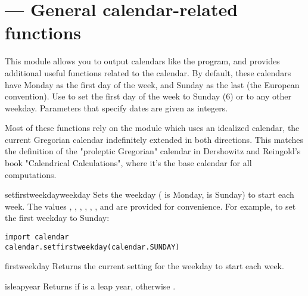 \section{ ---
         General calendar-related functions}


This module allows you to output calendars like the \UNIX{}
 program, and provides additional useful functions
related to the calendar. By default, these calendars have Monday as
the first day of the week, and Sunday as the last (the European
convention). Use  to set the first day of the
week to Sunday (6) or to any other weekday.  Parameters that specify
dates are given as integers.

Most of these functions rely on the  module which
uses an idealized calendar, the current Gregorian calendar indefinitely
extended in both directions.  This matches the definition of the
"proleptic Gregorian" calendar in Dershowitz and Reingold's book
"Calendrical Calculations", where it's the base calendar for all
computations.

\begin{funcdesc}{setfirstweekday}{weekday}
Sets the weekday ( is Monday,  is Sunday) to start
each week. The values , ,
, , ,
, and  are provided for
convenience. For example, to set the first weekday to Sunday:

\begin{verbatim}
import calendar
calendar.setfirstweekday(calendar.SUNDAY)
\end{verbatim}
\end{funcdesc}

\begin{funcdesc}{firstweekday}{}
Returns the current setting for the weekday to start each week.
\end{funcdesc}

\begin{funcdesc}{isleap}{year}
Returns  if  is a leap year, otherwise
.
\end{funcdesc}

